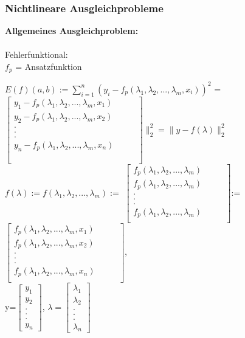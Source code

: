 \documentclass[../ZF_HM2.tex]{subfiles}
\begin{document}
\subsubsection{Nichtlineare Ausgleichprobleme}
\begin{mdframed}
	\textbf{Allgemeines Ausgleichproblem:\\\\}
	\colorbox{blue!10}{Fehlerfunktional:}\\
	$f_p$ = Ansatzfunktion
	
	$E(f)(a,b):= \sum_{i=1}^{n}(y_i-f_p(\lambda_1,\lambda_2,...,\lambda_m,x_i))^2$
	= $ \left[\begin {matrix}
y_1-f_p(\lambda_1,\lambda_2,...,\lambda_m,x_1)\\
y_2-f_p(\lambda_1,\lambda_2,...,\lambda_m,x_2)\\
.&&&\\
.\\
.\\
y_n-f_p(\lambda_1,\lambda_2,...,\lambda_m,x_n)\\\\\\
\end{matrix}\right]\|_2^2 = \|y-f(\lambda)\|_2^2$\\

$f(\lambda):=f(\lambda_1,\lambda_2,...,\lambda_m):=$ $\left[\begin {matrix}
f_p(\lambda_1,\lambda_2,...,\lambda_m)\\
f_p(\lambda_1,\lambda_2,...,\lambda_m)\\
.&&&\\
.\\
.\\
f_p(\lambda_1,\lambda_2,...,\lambda_m)\\
\end{matrix}\right]$:=
$ \left[\begin {matrix}
f_p(\lambda_1,\lambda_2,...,\lambda_m,x_1)\\
f_p(\lambda_1,\lambda_2,...,\lambda_m,x_2)\\
.&&&\\
.\\
.\\
f_p(\lambda_1,\lambda_2,...,\lambda_m,x_n)\\
\end{matrix}\right]$,\\
y=$\left[\begin{matrix}
y_1\\
y_2\\
.\\
.\\
.\\
y_n
\end{matrix}\right]$, $\lambda=\left[\begin {matrix}\lambda_1\\
\lambda_2\\
.\\
.\\
.\\
\lambda_n
\end{matrix}\right]$
	 
\end{mdframed}
\end{document}
